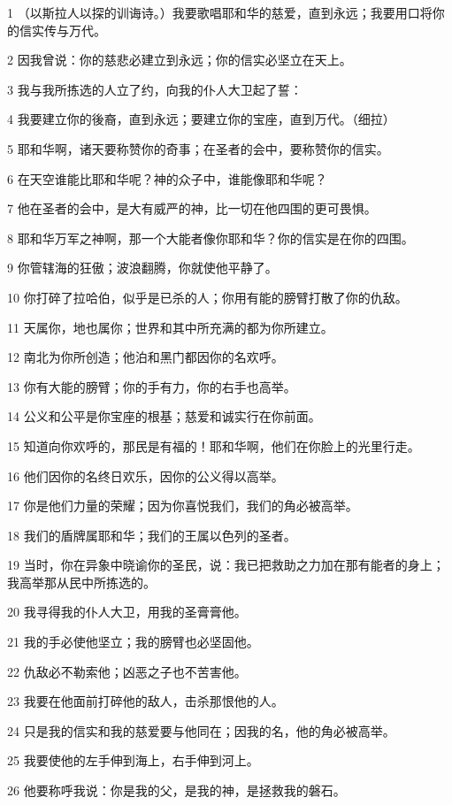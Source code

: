 \par 1 （以斯拉人以探的训诲诗。）我要歌唱耶和华的慈爱，直到永远；我要用口将你的信实传与万代。
\par 2 因我曾说：你的慈悲必建立到永远；你的信实必坚立在天上。
\par 3 我与我所拣选的人立了约，向我的仆人大卫起了誓：
\par 4 我要建立你的後裔，直到永远；要建立你的宝座，直到万代。（细拉）
\par 5 耶和华啊，诸天要称赞你的奇事；在圣者的会中，要称赞你的信实。
\par 6 在天空谁能比耶和华呢？神的众子中，谁能像耶和华呢？
\par 7 他在圣者的会中，是大有威严的神，比一切在他四围的更可畏惧。
\par 8 耶和华万军之神啊，那一个大能者像你耶和华？你的信实是在你的四围。
\par 9 你管辖海的狂傲；波浪翻腾，你就使他平静了。
\par 10 你打碎了拉哈伯，似乎是已杀的人；你用有能的膀臂打散了你的仇敌。
\par 11 天属你，地也属你；世界和其中所充满的都为你所建立。
\par 12 南北为你所创造；他泊和黑门都因你的名欢呼。
\par 13 你有大能的膀臂；你的手有力，你的右手也高举。
\par 14 公义和公平是你宝座的根基；慈爱和诚实行在你前面。
\par 15 知道向你欢呼的，那民是有福的！耶和华啊，他们在你脸上的光里行走。
\par 16 他们因你的名终日欢乐，因你的公义得以高举。
\par 17 你是他们力量的荣耀；因为你喜悦我们，我们的角必被高举。
\par 18 我们的盾牌属耶和华；我们的王属以色列的圣者。
\par 19 当时，你在异象中晓谕你的圣民，说：我已把救助之力加在那有能者的身上；我高举那从民中所拣选的。
\par 20 我寻得我的仆人大卫，用我的圣膏膏他。
\par 21 我的手必使他坚立；我的膀臂也必坚固他。
\par 22 仇敌必不勒索他；凶恶之子也不苦害他。
\par 23 我要在他面前打碎他的敌人，击杀那恨他的人。
\par 24 只是我的信实和我的慈爱要与他同在；因我的名，他的角必被高举。
\par 25 我要使他的左手伸到海上，右手伸到河上。
\par 26 他要称呼我说：你是我的父，是我的神，是拯救我的磐石。
